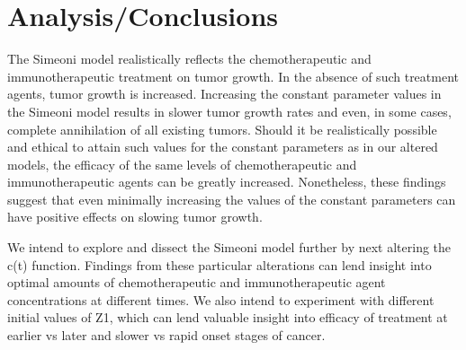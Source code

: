 \documentclass[11pt]{amsart}
\begin{document}
\section{Analysis/Conclusions}
The Simeoni model realistically reflects the chemotherapeutic and immunotherapeutic treatment on tumor growth. In the absence of such treatment agents, tumor growth is increased. Increasing the constant parameter values in the Simeoni model results in slower tumor growth rates and even, in some cases, complete annihilation of all existing tumors. Should it be realistically possible and ethical to attain such values for the constant parameters as in our altered models, the efficacy of the same levels of chemotherapeutic and immunotherapeutic agents can be greatly increased. Nonetheless, these findings suggest that even minimally increasing the values of the constant parameters can have positive effects on slowing tumor growth.


We intend to explore and dissect the Simeoni model further by next altering the c(t) function. Findings from these particular alterations can lend insight into optimal amounts of chemotherapeutic and immunotherapeutic agent concentrations at different times. We also intend to experiment with different initial values of Z1, which can lend valuable insight into efficacy of treatment at earlier vs later and slower vs rapid onset stages of cancer.







\FloatBarrier %
\newpage

{} %
\end{document}

